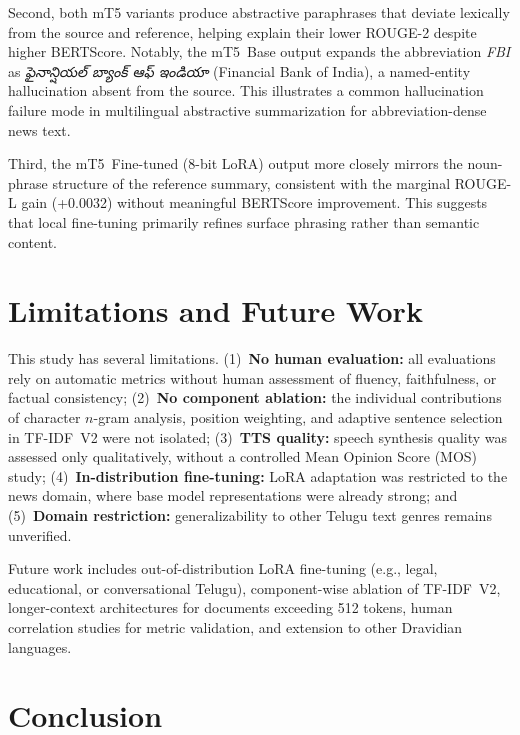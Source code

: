 \documentclass[runningheads]{llncs}
\begin{document}
Second, both mT5 variants produce abstractive paraphrases
that deviate lexically from the source and reference,
helping explain their lower ROUGE-2 despite higher
BERTScore. Notably, the mT5~Base output expands the
abbreviation \textit{FBI} as
\textit{{\telugufont ఫైనాన్షియల్ బ్యాంక్ ఆఫ్ ఇండియా}}
(Financial Bank of India), a named-entity hallucination
absent from the source. This illustrates a common
hallucination failure mode in multilingual abstractive
summarization for abbreviation-dense news text.

Third, the mT5~Fine-tuned (8-bit LoRA) output more closely
mirrors the noun-phrase structure of the reference summary,
consistent with the marginal ROUGE-L gain (+0.0032) without
meaningful BERTScore improvement. This suggests that local
fine-tuning primarily refines surface phrasing rather than
semantic content.

\FloatBarrier
\section{Limitations and Future Work}

This study has several limitations.
(1)~\textbf{No human evaluation:} all evaluations rely on
automatic metrics without human assessment of fluency,
faithfulness, or factual consistency;
(2)~\textbf{No component ablation:} the individual
contributions of character $n$-gram analysis, position
weighting, and adaptive sentence selection in TF-IDF~V2
were not isolated;
(3)~\textbf{TTS quality:} speech synthesis quality was
assessed only qualitatively, without a controlled Mean
Opinion Score (MOS) study;
(4)~\textbf{In-distribution fine-tuning:} LoRA adaptation
was restricted to the news domain, where base model
representations were already strong; and
(5)~\textbf{Domain restriction:} generalizability to other
Telugu text genres remains unverified.

Future work includes out-of-distribution LoRA fine-tuning
(e.g., legal, educational, or conversational Telugu),
component-wise ablation of TF-IDF~V2, longer-context
architectures for documents exceeding 512 tokens, human
correlation studies for metric validation, and extension
to other Dravidian languages.

\section{Conclusion}
\end{document}
